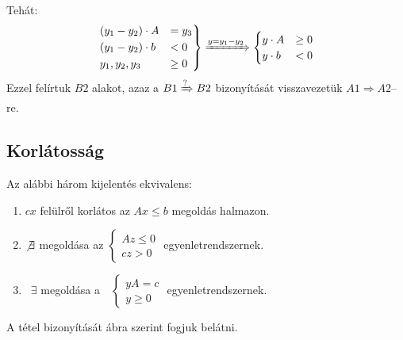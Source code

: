 Tehát:
\[
	\begin{rcases}
		(y_1 - y_2) \cdot A & = y_3  \\
		(y_1 - y_2) \cdot b & < 0    \\
		y_1, y_2, y_3       & \geq 0
	\end{rcases} \xRightarrow{y=y_1-y_2}
	\begin{cases}
		y \cdot A & \geq 0 \\
		y \cdot b & < 0
	\end{cases}
\]
Ezzel felírtuk $B2$ alakot, azaz a $B1\xRightarrow{?}B2$ bizonyítását
visszavezetük $A1 \Rightarrow A2$--re.

\subsection{Korlátosság}

Az alábbi három kijelentés ekvivalens:

\begin{enumerate}
	\item $cx$ felülről korlátos az $Ax \leq b$ megoldás halmazon.
	\item $\not \exists$ megoldása az $ \begin{cases}
			      Az \leq 0 \\
			      cz > 0
		      \end{cases} $ egyenletrendszernek.
	\item~$\exists$ megoldása a~~$\begin{cases}
			      yA=c \\
			      y \geq 0
		      \end{cases}$ egyenletrendszernek.
\end{enumerate}

A tétel bizonyítását  ábra szerint fogjuk belátni.

